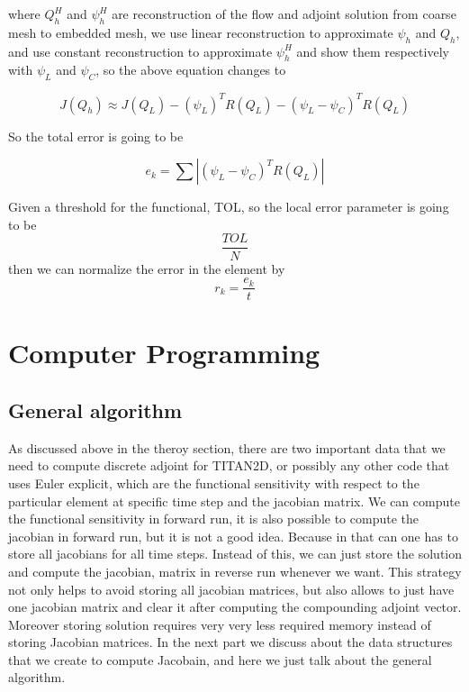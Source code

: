 \documentclass[a4paper,10pt]{article}
\begin{document}
where  $ Q^H_h $ and $ \psi^H_h $ are reconstruction of the flow and adjoint solution from coarse mesh to embedded mesh, we use linear reconstruction to approximate $ \psi_h $ and $ Q_h $, and use constant reconstruction to approximate  $ \psi^H_h $ and show them respectively with $ \psi_L $ and $ \psi_C $, so the above equation changes to 

\begin{equation}
\label{erradjmod}
J(Q_h) \approx  J(Q_L) - (\psi_L)^T R(Q_L) - (\psi_L - \psi_C)^T R(Q_L)
\end{equation}

So the total error is going to be 


\begin{equation}
\label{totalerr}
e_k=\sum |(\psi_L - \psi_C)^T R(Q_L)|
\end{equation}

Given a threshold for the functional, TOL, so the local error parameter is going to be
\begin{equation}
\frac{TOL}{N}
\end{equation} 
 then we can normalize the error in the element by
 \begin{equation}
 r_k = \frac{e_k}{t}
\end{equation} 

\section{Computer Programming}
\subsection{General algorithm}

As discussed above in the theroy section, there are two important data that we need to compute discrete adjoint for TITAN2D, or possibly any other code that uses Euler explicit, which are the functional sensitivity with respect to the particular element at specific time step and the jacobian matrix. We can compute the functional sensitivity in forward run, it is also possible to compute the jacobian in forward run, but it is not a good idea. Because in that can one has to store all jacobians for all time steps. Instead of this, we can just store the solution and compute the jacobian, matrix in reverse run whenever we want. This strategy not only helps to avoid storing all jacobian matrices, but also allows to just have one jacobian matrix and clear it after computing the compounding adjoint vector. Moreover storing solution requires very very less required memory instead of storing Jacobian matrices.
In the next part we discuss about the data structures that we create to compute Jacobain, and here we just talk about the general algorithm. \newline
\end{document}
